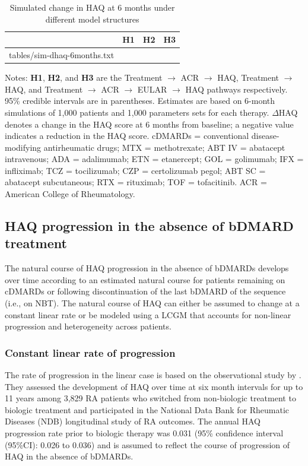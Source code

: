 \documentclass[11pt,final,fleqn]{article}\usepackage[]{graphicx}\usepackage[]{color}
\makeatletter
\theoremstyle{plain}
\newcommand*\ExpandableInput[1]{\@@input#1 }
\makeatother
\begin{document}
\begin{table}[!ht]
\begin{center}
\begin{threeparttable}
\caption{Simulated change in HAQ at 6 months under different model structures} \label{tbl:sim-haq-change}
\begin{tabularx}{\textwidth}{@{\extracolsep{\fill}}lccc}
\hline
\multicolumn{1}{l}{} & \multicolumn{1}{c}{\textbf{H1}} & \multicolumn{1}{c}{\textbf{H2}} & \multicolumn{1}{c}{\textbf{H3}} \\
\hline
\ExpandableInput{tables/sim-dhaq-6months.txt}
\hline
\end{tabularx}
\scriptsize
Notes: \textbf{H1}, \textbf{H2}, and \textbf{H3} are the Treatment $\rightarrow$ ACR $\rightarrow$ HAQ, Treatment $\rightarrow$ HAQ, and Treatment $\rightarrow$ ACR $\rightarrow$ EULAR $\rightarrow$ HAQ pathways respectively. 95\% credible intervals are in parentheses. Estimates are based on 6-month simulations of 1,000 patients and 1,000 parameters sets for each therapy. $\Delta$HAQ denotes a change in the HAQ score at 6 months from baseline; a negative value indicates a reduction in the HAQ score. cDMARDs = conventional disease-modifying antirheumatic drugs; MTX = methotrexate; ABT IV = abatacept intravenous; ADA = adalimumab; ETN = etanercept; GOL = golimumab; IFX = infliximab; TCZ = tocilizumab; CZP = certolizumab pegol; ABT SC = abatacept subcutaneous; RTX = rituximab; TOF = tofacitinib. ACR = American College of Rheumatology.
\end{threeparttable}
\end{center}
\end{table}

\subsection{HAQ progression in the absence of bDMARD treatment}\label{haq-progression-in-the-absence-of-bdmard-treatment}

The natural course of HAQ progression in the absence of bDMARDs develops over time according to an estimated natural course for patients remaining on cDMARDs or following discontinuation of the last bDMARD of the sequence (i.e., on NBT). The natural course of HAQ can either be assumed to change at a constant linear rate or be modeled using a LCGM that accounts for non-linear progression and heterogeneity across patients. 

\subsubsection{Constant linear rate of progression} \label{sec:haq-linear-rate}
The rate of progression in the linear case is based on the observational study by \citet{wolfe2010loss}. They assessed the development of HAQ over time at six month intervals for up to 11 years among 3,829 RA patients who switched from non-biologic treatment to biologic treatment and participated in the National Data Bank for Rheumatic Diseases (NDB) longitudinal study of RA outcomes. The annual HAQ progression rate prior to biologic therapy was 0.031 (95\% confidence interval (95\%CI): 0.026 to 0.036) and is assumed to reflect the course of progression of HAQ in the absence of bDMARDs.
\end{document}
